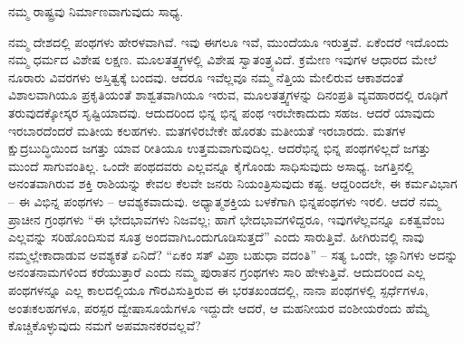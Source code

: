 ನಮ್ಮ ರಾಷ್ಟ್ರವು ನಿರ್ಮಾಣವಾಗುವುದು ಸಾಧ್ಯ.

ನಮ್ಮ ದೇಶದಲ್ಲಿ ಪಂಥಗಳು ಹೇರಳವಾಗಿವೆ. ಇವು ಈಗಲೂ ಇವೆ, ಮುಂದೆಯೂ ಇರುತ್ತವೆ. ಏಕೆಂದರೆ ಇದೊಂದು ನಮ್ಮ ಧರ್ಮದ ವಿಶೇಷ ಲಕ್ಷಣ. ಮೂಲತತ್ತ್ವಗಳಲ್ಲಿ ವಿಶೇಷ ಸ್ವಾತಂತ್ರ್ಯವಿದೆ. ಕ್ರಮೇಣ ಇವುಗಳ ಆಧಾರದ ಮೇಲೆ ನೂರಾರು ವಿವರಗಳು ಅಸ್ತಿತ್ವಕ್ಕೆ ಬಂದವು. ಆದರೂ ಇವೆಲ್ಲವೂ ನಮ್ಮ ನೆತ್ತಿಯ ಮೇಲಿರುವ ಆಕಾಶದಂತೆ ವಿಶಾಲವಾಗಿಯೂ ಪ್ರಕೃತಿಯಂತೆ ಶಾಶ್ವತವಾಗಿಯೂ ಇರುವ, ಮೂಲತತ್ತ್ವಗಳನ್ನು ದಿನಂಪ್ರತಿ ವ್ಯವಹಾರದಲ್ಲಿ ರೂಢಿಗೆ ತರುವುದಕ್ಕೋಸ್ಕರ ಸೃಷ್ಟಿಯಾದವು. ಆದುದರಿಂದ ಭಿನ್ನ ಭಿನ್ನ ಪಂಥ ಇರಬೇಕಾದುದು ಸಹಜ. ಆದರೆ ಯಾವುದು ಇರಬಾರದೆಂದರೆ ಮತೀಯ ಕಲಹಗಳು. ಮತಗಳಿರಬೇಕೇ ಹೊರತು ಮತೀಯತೆ ಇರಬಾರದು. ಮತಗಳ ಕ್ಷುದ್ರಬುದ್ಧಿಯಿಂದ ಜಗತ್ತು ಯಾವ ರೀತಿಯೂ ಉತ್ತಮವಾಗುವುದಿಲ್ಲ. ಆದರೆ\break ಭಿನ್ನ ಭಿನ್ನ ಪಂಥಗಳಿಲ್ಲದೆ ಜಗತ್ತು ಮುಂದೆ ಸಾಗುವಂತಿಲ್ಲ. ಒಂದೇ ಪಂಥ\-ದವರು ಎಲ್ಲವನ್ನೂ ಕೈಗೊಂಡು ಸಾಧಿಸುವುದು ಅಸಾಧ್ಯ. ಜಗತ್ತಿನಲ್ಲಿ ಅನಂತವಾಗಿರುವ ಶಕ್ತಿ ರಾಶಿಯನ್ನು ಕೇವಲ ಕೆಲವೇ ಜನರು ನಿಯಂತ್ರಿಸುವುದು ಕಷ್ಟ. ಆದ್ದರಿಂದಲೇ, ಈ ಕರ್ಮವಿಭಾಗ – ಈ ವಿಭಿನ್ನ ಪಂಥಗಳು – ಆವಶ್ಯಕವಾದುವು. ಅಧ್ಯಾತ್ಮಶಕ್ತಿಯ ಬಳಕೆಗಾಗಿ ಭಿನ್ನಪಂಥಗಳು ಇರಲಿ. ಆದರೆ ನಮ್ಮ ಪ್ರಾಚೀನ ಗ್ರಂಥಗಳು “ಈ ಭೇದಭಾವಗಳು ನಿಜವಲ್ಲ; ಹಾಗೆ ಭೇದಭಾವಗಳಿದ್ದರೂ, ಇವುಗಳೆಲ್ಲವನ್ನೂ ಏಕತ್ವವೆಂಬ ಎಲ್ಲವನ್ನು ಸರಿಹೊಂದಿಸುವ ಸೂತ್ರ ಅಂದವಾಗಿ\break ಒಂದುಗೂಡಿಸುತ್ತದೆ” ಎಂದು ಸಾರುತ್ತಿವೆ. ಹೀಗಿರುವಲ್ಲಿ ನಾವು ನಮ್ಮಲ್ಲೇ\break ಕಾದಾಡುವ ಅವಶ್ಯಕತೆ ಏನಿದೆ? “ಏಕಂ ಸತ್​ ವಿಪ್ರಾ ಬಹುಧಾ ವದಂತಿ” – ಸತ್ಯ ಒಂದೇ, ಜ್ಞಾನಿಗಳು ಅದನ್ನು ಅನಂತನಾಮಗಳಿಂದ ಕರೆಯುತ್ತಾರೆ ಎಂದು ನಮ್ಮ ಪುರಾತನ ಗ್ರಂಥಗಳು ಸಾರಿ ಹೇಳುತ್ತಿವೆ. ಆದುದರಿಂದ ಎಲ್ಲ ಪಂಥಗಳನ್ನೂ ಎಲ್ಲ ಕಾಲದಲ್ಲಿಯೂ ಗೌರವಿಸುತ್ತಿರುವ ಈ ಭರತಖಂಡದಲ್ಲಿ, ನಾನಾ ಪಂಥಗಳಲ್ಲಿ ಸ್ಪರ್ಧೆಗಳೂ, ಅಂತಃಕಲಹಗಳೂ, ಪರಸ್ಪರ ದ್ವೇಷಾಸೂಯೆಗಳೂ ಇದ್ದುದೇ ಆದರೆ, ಆ ಮಹನೀಯರ ವಂಶೀಯರೆಂದು ಹೆಮ್ಮೆ ಕೊಚ್ಚಿಕೊಳ್ಳುವುದು ನಮಗೆ ಅಪಮಾನಕರವಲ್ಲವೆ?

